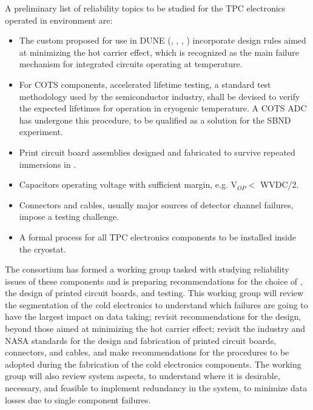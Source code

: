 A preliminary list of reliability topics to be studied for the TPC electronics operated 
in  environment are:
\begin{itemize}
	\item The custom  proposed for use in DUNE (, 
	, , ) incorporate design rules 
	aimed at minimizing the hot carrier effect\cite{Li:2013ieee}\cite{Hoff:2015hax}, 
	which is recognized as the main failure mechanism for integrated circuits 
	operating at  temperature.
	\item For COTS components, accelerated lifetime testing, a standard test 
	methodology used by the semiconductor industry, shall be devised to verify 
	the expected lifetimes for operation in cryogenic temperature. A COTS ADC has 
	undergone this procedure, to be qualified as a solution for the SBND 
	experiment\cite{Chen:2018zic}.
	\item Print circuit board assemblies designed and fabricated to survive 
	repeated immersions in \lntwo.
	\item Capacitors operating voltage with sufficient margin, e.g. V$_{OP}<$ WVDC/2.
	\item Connectors and cables, usually major sources of detector channel 
	failures, impose a testing challenge.
        \item A formal  process for all TPC electronics components to be installed inside the cryostat.
\end{itemize}
The  consortium has formed a working group tasked with studying reliability issues 
of these components and is preparing recommendations for the choice of , 
the design of printed circuit boards, and testing. This working group will review the 
segmentation of the cold electronics to understand which failures are going to have the 
largest impact on data taking; revisit recommendations for the  design, 
beyond those aimed at minimizing the hot carrier effect; revisit the industry and 
NASA standards for the design and fabrication of printed circuit boards, connectors, 
and cables, and make recommendations for the  procedures to be adopted during 
the fabrication of the cold electronics components. The working group will also review
system aspects, to understand where it is desirable, necessary, and feasible to implement 
redundancy in the system, to minimize data losses due to single component failures. 
